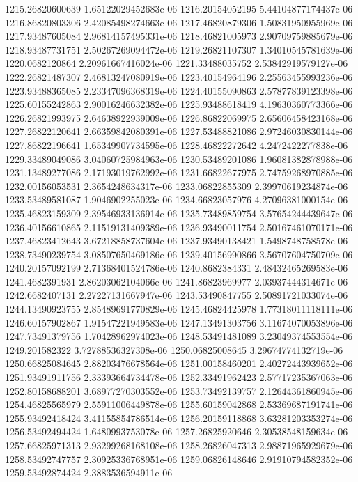 {1215.26820600639 1.65122029452683e-06
1216.20154052195 5.44104877174437e-06
1216.86820803306 2.42085498274663e-06
1217.46820879306 1.50831950955969e-06
1217.93487605084 2.96814157495331e-06
1218.46821005973 2.90709759885679e-06
1218.93487731751 2.50267269094472e-06
1219.26821107307 1.34010545781639e-06
1220.0682120864 2.20961667416024e-06
1221.33488035752 2.53842919579127e-06
1222.26821487307 2.46813247080919e-06
1223.40154964196 2.25563455993236e-06
1223.93488365085 2.23347096368319e-06
1224.40155090863 2.57877839123398e-06
1225.60155242863 2.90016246632382e-06
1225.93488618419 4.19630360773366e-06
1226.26821993975 2.64638922939009e-06
1226.86822069975 2.65606458423168e-06
1227.26822120641 2.66359842080391e-06
1227.53488821086 2.97246030830144e-06
1227.86822196641 1.65349907734595e-06
1228.46822272642 4.2472422277838e-06
1229.33489049086 3.04060725984963e-06
1230.53489201086 1.96081382878988e-06
1231.13489277086 2.17193019762992e-06
1231.66822677975 2.74759268970885e-06
1232.00156053531 2.3654248634317e-06
1233.06822855309 2.39970619234874e-06
1233.53489581087 1.9046902255023e-06
1234.66823057976 4.27096381000154e-06
1235.46823159309 2.39546933136914e-06
1235.73489859754 3.57654244439647e-06
1236.40156610865 2.11519131409389e-06
1236.93490011754 2.50167461070171e-06
1237.46823412643 3.67218858737604e-06
1237.93490138421 1.5498748758578e-06
1238.73490239754 3.08507650469186e-06
1239.40156990866 3.56707604750709e-06
1240.20157092199 2.71368401524786e-06
1240.8682384331 2.48432465269583e-06
1241.4682391931 2.86203062104066e-06
1241.86823969977 2.03937444314671e-06
1242.6682407131 2.27227131667947e-06
1243.53490847755 2.50891721033074e-06
1244.13490923755 2.85489691770829e-06
1245.46824425978 1.77318011118111e-06
1246.60157902867 1.91547221949583e-06
1247.13491303756 3.11674070053896e-06
1247.73491379756 1.70428962974023e-06
1248.53491481089 3.23049374553554e-06
1249.201582322 3.72788536327308e-06
1250.06825008645 3.29674774132719e-06
1250.66825084645 2.88203476678564e-06
1251.00158460201 2.40272443939652e-06
1251.93491911756 2.33393664734478e-06
1252.33491962423 2.57717235367063e-06
1252.80158688201 3.68977270303552e-06
1253.73492139757 2.12644361860945e-06
1254.46825565979 2.55911006449878e-06
1255.60159042868 2.53369687191741e-06
1255.93492418424 3.41155854786514e-06
1256.20159118868 3.63281203353274e-06
1256.53492494424 1.6480993753078e-06
1257.26825920646 2.30538548159634e-06
1257.66825971313 2.93299268168108e-06
1258.26826047313 2.98871965929679e-06
1258.53492747757 2.30925336768951e-06
1259.06826148646 2.91910794582352e-06
1259.53492874424 2.3883536594911e-06
}
